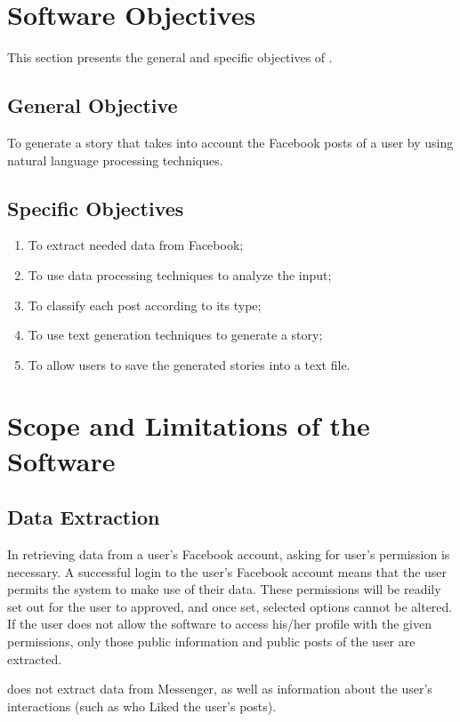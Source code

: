 \section{Software Objectives}
This section presents the general and specific objectives of \systemname.

\subsection{General Objective}
To generate a story that takes into account the Facebook posts of a user by using natural language processing techniques.

\subsection{Specific Objectives}
\begin{enumerate}
\item To extract needed data from Facebook;
\item To use data processing techniques to analyze the input; 
\item To classify each post according to its type;
\item To use text generation techniques to generate a story;
\item To allow users to save the generated stories into a text file.
\end{enumerate}

\section{Scope and Limitations of the Software}

\subsection{Data Extraction}
In retrieving data from a user's Facebook account, asking for user's permission is necessary. A successful login to the user's Facebook account means that the user permits the system to make use of their data. These permissions will be readily set out for the user to approved, and once set, selected options cannot be altered. If the user does not allow the software to access his/her profile with the given permissions, only those public information and public posts of the user are extracted. 

\systemname does not extract data from Messenger, as well as information about the user's interactions (such as who Liked the user's posts).

